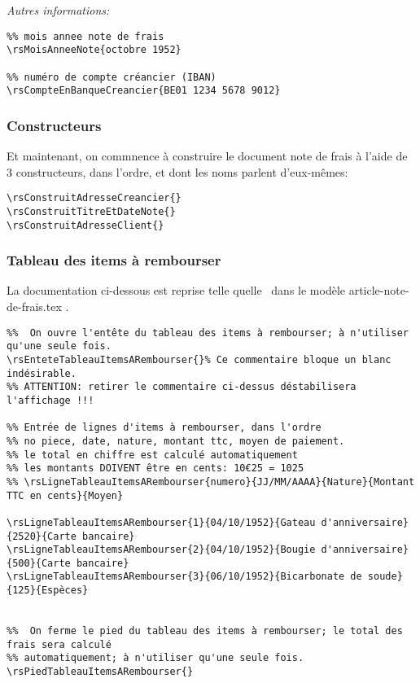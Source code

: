 \documentclass[a4paper,10pt]{article}
\begin{document}
\emph{Autres informations:}
\begin{lstlisting}
%% mois annee note de frais
\rsMoisAnneeNote{octobre 1952}

%% numéro de compte créancier (IBAN)
\rsCompteEnBanqueCreancier{BE01 1234 5678 9012}
\end{lstlisting}

\subsubsection{Constructeurs} 
Et maintenant, on commnence à construire le document note de frais à l'aide de 3 constructeurs, dans l'ordre, et dont les noms parlent d'eux-mêmes:
\begin{lstlisting}
\rsConstruitAdresseCreancier{}
\rsConstruitTitreEtDateNote{}
\rsConstruitAdresseClient{}
\end{lstlisting}


\subsubsection{Tableau des items à rembourser}

La documentation ci-dessous est reprise \og telle quelle \fg\ dans le modèle \og article-note-de-frais.tex \fg.


\begin{lstlisting}
%%  On ouvre l'entête du tableau des items à rembourser; à n'utiliser qu'une seule fois.
\rsEnteteTableauItemsARembourser{}% Ce commentaire bloque un blanc indésirable.
%% ATTENTION: retirer le commentaire ci-dessus déstabilisera l'affichage !!!

%% Entrée de lignes d'items à rembourser, dans l'ordre 
%% no piece, date, nature, montant ttc, moyen de paiement.
%% le total en chiffre est calculé automatiquement
%% les montants DOIVENT être en cents: 10€25 = 1025
%% \rsLigneTableauItemsARembourser{numero}{JJ/MM/AAAA}{Nature}{Montant TTC en cents}{Moyen}

\rsLigneTableauItemsARembourser{1}{04/10/1952}{Gateau d'anniversaire}{2520}{Carte bancaire}
\rsLigneTableauItemsARembourser{2}{04/10/1952}{Bougie d'anniversaire}{500}{Carte bancaire}
\rsLigneTableauItemsARembourser{3}{06/10/1952}{Bicarbonate de soude}{125}{Espèces}


%%  On ferme le pied du tableau des items à rembourser; le total des frais sera calculé 
%% automatiquement; à n'utiliser qu'une seule fois.
\rsPiedTableauItemsARembourser{}
\end{lstlisting}
\end{document}

